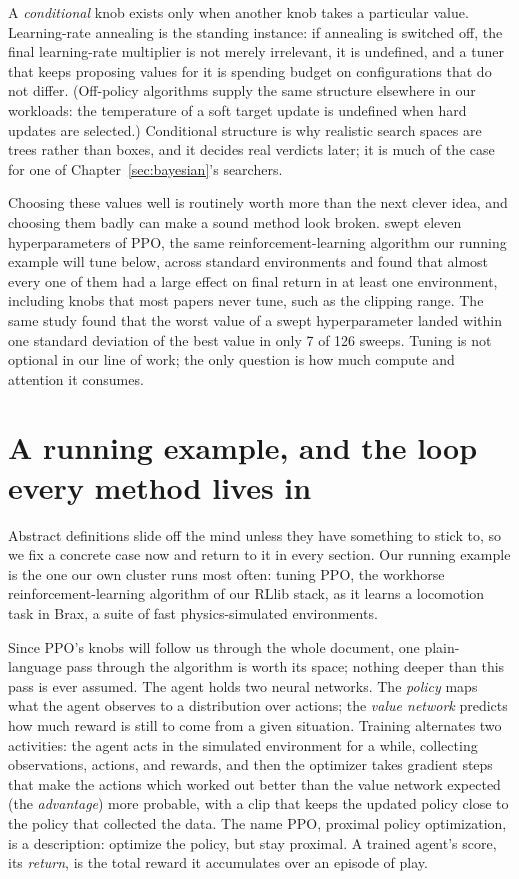 A \emph{conditional} knob exists only when another knob takes a
particular value. Learning-rate annealing is the standing instance: if
annealing is switched off, the final learning-rate multiplier is not
merely irrelevant, it is undefined, and a tuner that keeps proposing
values for it is spending budget on configurations that do not differ.
(Off-policy algorithms supply the same structure elsewhere in our
workloads: the temperature of a soft target update is undefined when
hard updates are selected.)
Conditional structure is why realistic search spaces are trees rather
than boxes, and it decides real verdicts later; it is much of the case
for one of Chapter~\ref{sec:bayesian}'s searchers.

Choosing these values well is routinely worth more than
the next clever idea, and choosing them badly can make a sound method look
broken. \citet{eimer2023hyperparameters} swept eleven hyperparameters of
PPO, the same reinforcement-learning algorithm our running example will
tune below, across standard environments and found that almost every one of them had a
large effect on final return in at least one environment, including knobs that
most papers never tune, such as the clipping range. The same study found that
the worst value of a swept hyperparameter landed within one standard deviation
of the best value in only 7 of 126 sweeps. Tuning is not optional in our line
of work; the only question is how much compute and attention it consumes.

\section{A running example, and the loop every method lives in}
\label{sec:running}

Abstract definitions slide off the mind unless they have something to stick
to, so we fix a concrete case now and return to it in every section. Our
running example is the one our own cluster runs most often: tuning PPO,
the workhorse reinforcement-learning algorithm of our RLlib stack, as it
learns a locomotion task in Brax, a suite of fast physics-simulated
environments.

Since PPO's knobs will follow us through the whole document, one
plain-language pass through the algorithm is worth its space; nothing
deeper than this pass is ever assumed. The agent holds two neural
networks. The \emph{policy} maps what the agent observes to a
distribution over actions; the \emph{value network} predicts how much
reward is still to come from a given situation. Training alternates two
activities: the agent acts in the simulated environment for a while,
collecting observations, actions, and rewards, and then the optimizer
takes gradient steps that make the actions which worked out better than
the value network expected (the \emph{advantage}) more probable, with a
clip that keeps the updated policy close to the policy that collected
the data. The name PPO, proximal policy optimization, is a description:
optimize the policy, but stay proximal. A trained agent's score, its
\emph{return}, is the total reward it accumulates over an episode of
play.

